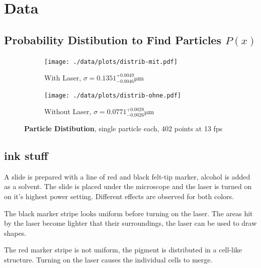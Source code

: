 \chapter{Data}

\section{Probability Distibution to Find Particles $P(x)$}

\begin{figure}
  \centering
  \begin{subfigure}{.45\textwidth}
    \centering
    \texttt{[image: ./data/plots/distrib-mit.pdf]}
    \caption{With Laser, $\sigma = \num{0.1351}^{+0.0049}_{-0.0046}\si{\um}$}
  \end{subfigure}
  \begin{subfigure}{.45\textwidth}
    \centering
    \texttt{[image: ./data/plots/distrib-ohne.pdf]}
    \caption{Without Laser, $\sigma = \num{0.0771}^{+0.0028}_{-0.0026}\si{\um}$}
  \end{subfigure}
  \caption[Particle Distibution]{\textbf{Particle Distibution}, single particle each, 402 points at 13 fps}
\end{figure}

\section{ink stuff}
A slide is prepared with a line of red and black felt-tip marker, alcohol is added as a solvent.
The slide is placed under the microscope and the laser is turned on on it's highest power setting.
Different effects are observed for both colors.

The black marker stripe looks uniform before turning on the laser.
The areas hit by the laser become lighter that their surroundings, the laser can be used to draw shapes.

The red marker stripe is not uniform, the pigment is distributed in a cell-like structure.
Turning on the laser causes the individual cells to merge.

